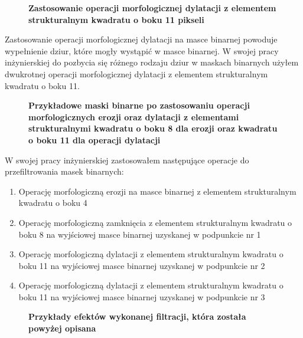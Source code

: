\documentclass[a4paper,12pt,twoside,openany]{report}
\newcommand{\ImgPath}{.}
\begin{document}
\begin{figure}[H]
	\centering
	\caption{  \textbf{Zastosowanie operacji morfologicznej dylatacji z elementem strukturalnym kwadratu o boku 11 pikseli}}
\end{figure}

Zastosowanie operacji morfologicznej dylatacji na masce binarnej powoduje wypełnienie dziur, które mogły wystąpić w masce binarnej. W swojej pracy inżynierskiej do pozbycia się różnego rodzaju dziur w maskach binarnych  użyłem dwukrotnej operacji morfologicznej dylatacji z elementem strukturalnym kwadratu o boku 11. 

\begin{figure}[H]
	\centering
	\caption{  \textbf{Przykładowe maski binarne po zastosowaniu operacji morfologicznych erozji oraz dylatacji z elementami strukturalnymi kwadratu o boku 8 dla erozji oraz kwadratu o boku 11 dla operacji dylatacji}}
\end{figure}

W swojej pracy inżynierskiej zastosowałem następujące operacje do przefiltrowania masek binarnych: 
\begin{enumerate}
	\item Operację morfologiczną erozji na masce binarnej z elementem strukturalnym kwadratu o boku 4
	\item Operację morfologiczną zamknięcia z elementem strukturalnym kwadratu o boku 8 na wyjściowej masce binarnej uzyskanej w podpunkcie nr 1
	\item Operację morfologiczną dylatacji z elementem strukturalnym kwadratu o boku 11 na wyjściowej masce binarnej uzyskanej w podpunkcie nr 2
	\item Operację morfologiczną dylatacji z elementem strukturalnym kwadratu o boku 11 na wyjściowej masce binarnej uzyskanej w podpunkcie nr 3
\end{enumerate}

\begin{figure}[H]
	\centering
	\caption{  \textbf{Przykłady efektów wykonanej filtracji, która została powyżej opisana}}
\end{figure}
\end{document}
